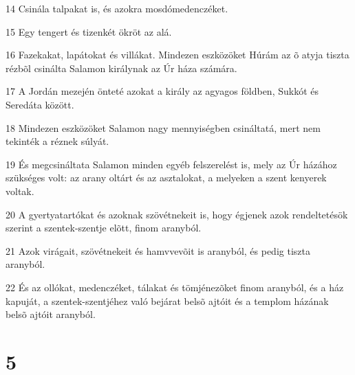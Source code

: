 \par 14 Csinála talpakat is, és azokra mosdómedenczéket.
\par 15 Egy tengert és tizenkét ökröt az alá.
\par 16 Fazekakat, lapátokat és villákat. Mindezen eszközöket Húrám az õ atyja tiszta rézbõl csinálta Salamon királynak az Úr háza számára.
\par 17 A Jordán mezején önteté azokat a király az agyagos földben, Sukkót és Seredáta között.
\par 18 Mindezen eszközöket Salamon nagy mennyiségben csináltatá, mert nem tekinték a réznek súlyát.
\par 19 És megcsináltata Salamon minden egyéb felszerelést is, mely az Úr házához szükséges volt: az arany oltárt és az asztalokat, a melyeken a szent kenyerek voltak.
\par 20 A gyertyatartókat és azoknak szövétnekeit is, hogy égjenek azok rendeltetésök szerint a szentek-szentje elõtt, finom aranyból.
\par 21 Azok virágait, szövétnekeit és hamvvevõit is aranyból, és pedig tiszta aranyból.
\par 22 És az ollókat, medenczéket, tálakat és tömjénezõket finom aranyból, és a ház kapuját, a szentek-szentjéhez való bejárat belsõ ajtóit és a templom házának belsõ ajtóit aranyból.

\chapter{5}


